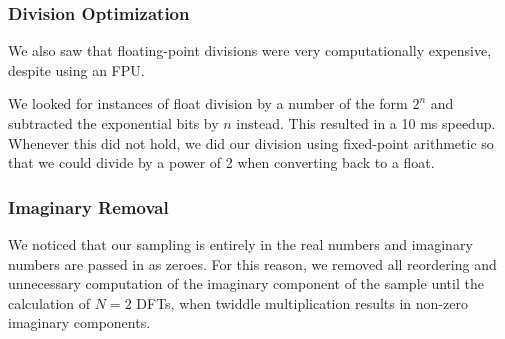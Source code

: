 \documentclass{article}
\begin{document}
		\subsubsection{Division Optimization}
			We also saw that floating-point divisions were very computationally expensive, despite using an FPU. 

			We looked for instances of float division by a number of the form $2^n$ and subtracted the exponential bits by $n$ instead. This resulted in a 10 ms speedup. 
			Whenever this did not hold, we did our division using fixed-point arithmetic so that we could divide by a power of 2 when converting back to a float.
		\subsubsection{Imaginary Removal}
			We noticed that our sampling is entirely in the real numbers and imaginary numbers are passed in as zeroes.
			For this reason, we removed all reordering and unnecessary computation of the imaginary component of the sample until the calculation of $N=2$ DFTs, when twiddle multiplication results in non-zero imaginary components.
\end{document}
